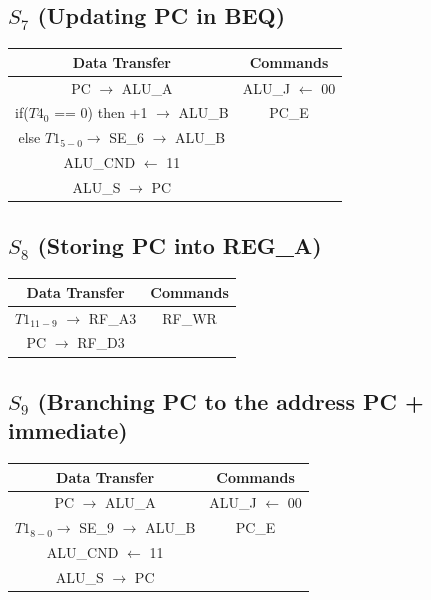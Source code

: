 \documentclass[]{report}
\begin{document}
        \subsection*{$S_7$ (Updating PC in BEQ)} %
        \begin{center}
            \begin{tabular}{|c|c|}
                \hline
                Data Transfer & Commands \\
                \hline
                PC $\to$ ALU\_A & ALU\_J $\leftarrow$ 00\\
                if($T4_0$ == 0) then +1 $\to$ ALU\_B & PC\_E\\
                else $T1_{5-0} \to$ SE\_6 $\to$ ALU\_B & \\
                ALU\_CND $\leftarrow$ 11 & \\
                ALU\_S $\to$ PC & \\
                \hline
            \end{tabular}
        \end{center}
        \subsection*{$S_8$ (Storing PC into REG\_A)} %
        \begin{center}
            \begin{tabular}{|c|c|}
                \hline
                Data Transfer & Commands \\
                \hline
                $T1_{11-9}$ $\to$ RF\_A3 & RF\_WR\\
                PC $\to$ RF\_D3 & \\
                \hline
            \end{tabular}
        \end{center}
        \subsection*{$S_9$ (Branching PC to the address PC + immediate)} %
        \begin{center}
            \begin{tabular}{|c|c|}
                \hline
                Data Transfer & Commands \\
                \hline
                PC $\to$ ALU\_A & ALU\_J $\leftarrow$ 00\\
                $T1_{8-0} \to$ SE\_9 $\to$ ALU\_B & PC\_E\\
                ALU\_CND $\leftarrow$ 11 & \\
                ALU\_S $\to$ PC & \\
                \hline
            \end{tabular}
        \end{center}
\end{document}
